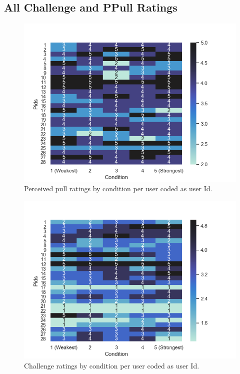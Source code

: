 \subsection{All Challenge and PPull Ratings}
\label{subsection:heatmap}
\begin{figure}[H]
\centering
\includegraphics[scale=0.7]{Files/Plots/ppull_by_condition_heatmap.png}
\caption{Perceived pull ratings by condition per user coded as user Id.}
\label{fig:ppullHeatmap}
\end{figure}

\vspace{-10mm}
\begin{figure}[H]
 \centering
\includegraphics[scale=0.7]{Files/Plots/challenge_by_condition_heatmap.png}
\caption{Challenge ratings by condition per user coded as user Id.}
\label{fig:challengeHeatmap}
\end{figure}
\clearpage

